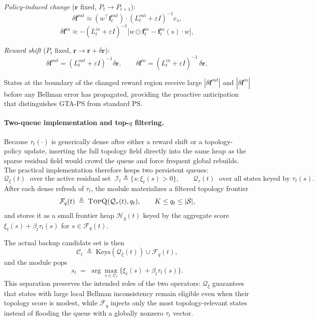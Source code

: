 \documentclass[10pt,a4paper]{article}
\begin{document}
\textit{Policy-induced change} ($\mathbf{r}$ fixed, $P_t \to P_{t+1}$):
\[
  \delta\mathbf{f}^{out} \approx (w^\top\mathbf{f}^{out}_t)\cdot(L^{out}_t+\varepsilon I)^{-1}e_s,
\]
\[
  \delta\mathbf{f}^{in} \approx -(L^{in}_t+\varepsilon I)^{-1}\bigl[w\odot\mathbf{f}^{in}_t - \mathbf{f}^{in}_t(s)\cdot w\bigr],
\]

\textit{Reward shift} ($P_t$ fixed, $\mathbf{r} \to \mathbf{r}+\delta\mathbf{r}$):
\[
  \delta\mathbf{f}^{out} = (L^{out}_t+\varepsilon I)^{-1}\delta\mathbf{r}, \qquad
  \delta\mathbf{f}^{in} = (L^{in}_t+\varepsilon I)^{-1}\,\delta\mathbf{r},
\]

States at the boundary of the changed reward region receive large $|\delta\mathbf{f}^{out}|$
and $|\delta\mathbf{f}^{in}|$ before any Bellman error has propagated, providing the
proactive anticipation that distinguishes GTA-PS from standard PS.


\paragraph{Two-queue implementation and top-$q$ filtering.}
Because $\tau_t(\cdot)$ is generically dense after either a reward shift or a topology-policy update, inserting the full topology field directly into the same heap as the sparse residual field would crowd the queue and force frequent global rebuilds. The practical implementation therefore keeps two persistent queues:
\[
  \mathcal{Q}_{\xi}(t) \;\text{ over the active residual set }\; \mathcal{I}_t \triangleq \{s:\xi_t(s)>0\},
  \qquad
  \mathcal{Q}_{\tau}(t) \;\text{ over all states keyed by }\tau_t(s).
\]
After each dense refresh of $\tau_t$, the module materializes a filtered topology frontier
\[
  \mathcal{F}_q(t) \;\triangleq\; \textsc{TopQ}(\mathcal{Q}_{\tau}(t), q_t),
  \qquad K \leq q_t \leq |\mathcal{S}|,
\]
and stores it as a small frontier heap $\mathcal{H}_q(t)$ keyed by the aggregate score $\xi_t(s)+\beta_t\tau_t(s)$ for $s\in\mathcal{F}_q(t)$.

The actual backup candidate set is then
\[
  \mathcal{C}_t \;\triangleq\; \mathrm{Keys}(\mathcal{Q}_{\xi}(t)) \cup \mathcal{F}_q(t),
\]
and the module pops
\[
  s_t \;=\; \arg\max_{s\in\mathcal{C}_t}\bigl\{\xi_t(s)+\beta_t\tau_t(s)\bigr\}.
\]
This separation preserves the intended roles of the two operators: $\mathcal{Q}_{\xi}$ guarantees that states with large local Bellman inconsistency remain eligible even when their topology score is modest, while $\mathcal{F}_q$ injects only the most topology-relevant states instead of flooding the queue with a globally nonzero $\tau_t$ vector.
\end{document}

